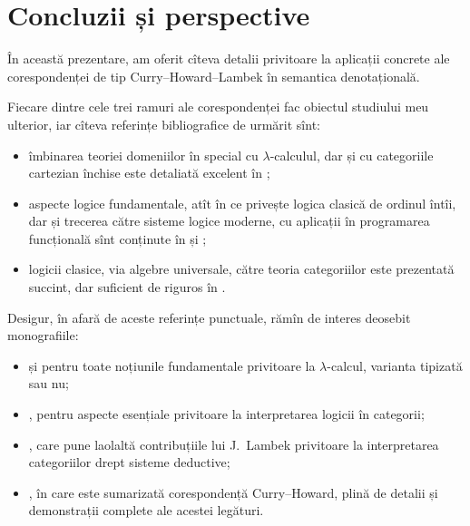 \chapter*{Concluzii și perspective}


\indent\indent În această prezentare, am oferit cîteva detalii privitoare la aplicații concrete
ale co\-res\-pon\-den\-ței de tip Curry--Howard--Lambek în semantica denotațională.

Fiecare dintre cele trei ramuri ale corespondenței fac obiectul studiului meu
ulterior, iar cîteva referințe bibliografice de urmărit sînt:
\begin{itemize}
\item îmbinarea teoriei domeniilor în special cu $\lambda$-calculul, dar și cu
  categoriile cartezian închise este detaliată excelent în \cite{amacur};
\item aspecte logice fundamentale, atît în ce privește logica clasică de ordinul
  întîi, dar și trecerea către sisteme logice moderne, cu aplicații în programarea
  funcțională sînt conținute în \cite{girlog} și \cite{girpf};
\item {} logicii clasice, via algebre universale, către teoria
  categoriilor este prezentată succint, dar suficient de riguros în \cite{pitts}.
\end{itemize}

Desigur, în afară de aceste referințe punctuale, rămîn de interes deosebit monografiile:
\begin{itemize}
\item \cite{barls} și \cite{barlt} pentru toate noțiunile fundamentale privitoare la
  $ \lambda $-calcul, varianta tipizată sau nu;
\item \cite{jac}, pentru aspecte esențiale privitoare la interpretarea logicii în categorii;
\item \cite{lascott}, care pune laolaltă contribuțiile lui J.\ Lambek privitoare la
  interpretarea categoriilor drept sisteme deductive;
\item \cite{ch}, în care este sumarizată corespondență Curry--Howard, plină de detalii
  și demonstrații complete ale acestei legături.
\end{itemize}

